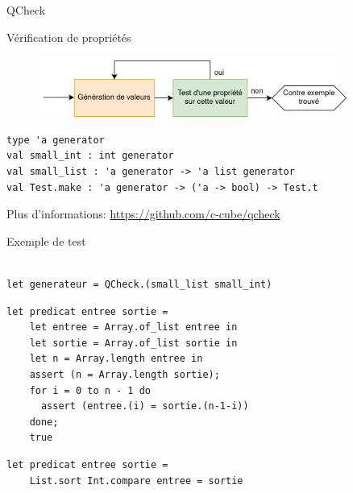 
\begin{frame}[fragile]{QCheck}
    
Vérification de propriétés

\begin{figure}
    \centering
    \includegraphics[width=0.9\textwidth]{slides/images/qcheck.drawio.png}
\end{figure}


\begin{lstlisting}
type 'a generator
val small_int : int generator
val small_list : 'a generator -> 'a list generator
val Test.make : 'a generator -> ('a -> bool) -> Test.t
\end{lstlisting}

Plus d'informations: \url{https://github.com/c-cube/qcheck}
\end{frame}

\begin{frame}[fragile]{Exemple de test}

\begin{lstlisting}

let generateur = QCheck.(small_list small_int)
\end{lstlisting}

\begin{lstlisting}
let predicat entree sortie =
    let entree = Array.of_list entree in
    let sortie = Array.of_list sortie in
    let n = Array.length entree in
    assert (n = Array.length sortie);
    for i = 0 to n - 1 do
      assert (entree.(i) = sortie.(n-1-i))
    done;
    true
\end{lstlisting}

\begin{lstlisting}
let predicat entree sortie =
    List.sort Int.compare entree = sortie
\end{lstlisting}

\end{frame}

